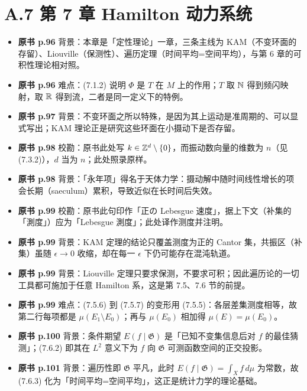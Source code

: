 \section*{A.7 第 7 章 Hamilton 动力系统}
\begin{itemize}[leftmargin=2.4em,itemsep=4pt,label={\textbullet}]
\item \textbf{原书 p.96} 背景：本章是「定性理论」一章，三条主线为 KAM（不变环面的存留）、Liouville（保测性）、遍历定理（时间平均=空间平均），与第 6 章的可积性理论相对照。
\item \textbf{原书 p.96} 难点：(7.1.2) 说明 $\Phi$ 是 $T$ 在 $M$ 上的作用；$T$ 取 $\mathbb{N}$ 得到频闪映射，取 $\mathbb{R}$ 得到流，二者是同一定义下的特例。
\item \textbf{原书 p.97} 背景：不变环面之所以特殊，是因为其上运动是准周期的、可以显式写出；KAM 理论正是研究这些环面在小摄动下是否存留。
\item \textbf{原书 p.98} 校勘：原书此处写 $k\in\mathbb{Z}^d\setminus\{0\}$，而振动数向量的维数为 $n$（见 (7.3.2)），$d$ 当为 $n$；此处照录原样。
\item \textbf{原书 p.98} 背景：「永年项」得名于天体力学：摄动解中随时间线性增长的项会长期（saeculum）累积，导致近似在长时间后失效。
\item \textbf{原书 p.99} 校勘：原书此句印作「正の Lebesgue 速度」，据上下文（补集的「測度」）应为「Lebesgue 測度」；此处译作测度并注明。
\item \textbf{原书 p.99} 背景：KAM 定理的结论只覆盖测度为正的 Cantor 集，共振区（补集）虽随 $\epsilon\to0$ 收缩，却在每一 $\epsilon$ 下仍可能存在混沌轨道。
\item \textbf{原书 p.99} 背景：Liouville 定理只要求保测，不要求可积；因此遍历论的一切工具都可施加于任意 Hamilton 系，这是第 7.5、7.6 节的前提。
\item \textbf{原书 p.99} 难点：(7.5.6) 到 (7.5.7) 的变形用 (7.5.5)：各层差集测度相等，故第二行每项都是 $\mu(E_1\setminus E_0)$；再与 $\mu(E_0)$ 相加得 $\mu(E)=\mu(E_0)$。
\item \textbf{原书 p.100} 背景：条件期望 $E(f\mid\mathfrak{G})$ 是「已知不变集信息后对 $f$ 的最佳猜测」；(7.6.2) 即其在 $L^2$ 意义下为 $f$ 向 $\mathfrak{G}$ 可测函数空间的正交投影。
\item \textbf{原书 p.101} 背景：遍历性即 $\mathfrak{G}$ 平凡，此时 $E(f\mid\mathfrak{G})=\int_X f\,d\mu$ 为常数，故 (7.6.3) 化为「时间平均=空间平均」，这正是统计力学的理论基础。
\end{itemize}

